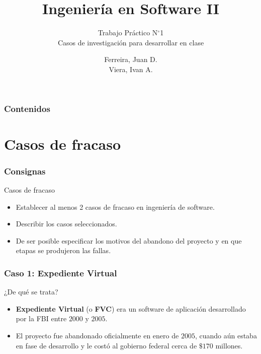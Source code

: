 \documentclass[11pt]{beamer}
\title{Ingeniería en Software II}
\subtitle[TPN1]{Trabajo Práctico N$^{\circ}$1\\ 
	Casos de investigación para desarrollar en clase}
\author{Ferreira, Juan D.\\ %
	    Viera, Ivan A.      %
}
\begin{document}
	
	\begin{frame} %
		\titlepage
	\end{frame}

	\begin{frame}
		\frametitle{Contenidos}
		\tableofcontents[pausesections]
	\end{frame}

	\section[Casos de fracaso]{Casos de fracaso}
	\begin{frame}
		\frametitle{Consignas}
		\begin{exampleblock}{Casos de fracaso}
			\begin{itemize}
				\item Establecer al menos 2 casos de fracaso en ingeniería de software.
				\item Describir los casos seleccionados.
				\item De ser posible especificar los motivos del abandono del proyecto y en que etapas se produjeron
				las fallas.
			\end{itemize}
		\end{exampleblock}
	\end{frame}

	\begin{frame}
		\frametitle{Caso 1: Expediente Virtual}
		\begin{block}{¿De qué se trata?}
			\begin{itemize}
				\item \textbf{Expediente Virtual} (o \textbf{FVC}) era un software de aplicación desarrollado por la FBI entre $2000$ y $2005$.
				\item El proyecto fue abandonado oficialmente en enero de $2005$, cuando aún estaba en fase de desarrollo y le costó al gobierno federal cerca de $\$170$ millones.
			\end{itemize}
		\end{block}
	\end{frame}
\end{document}
